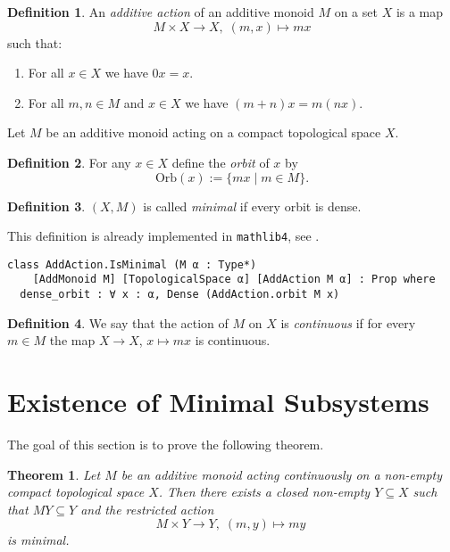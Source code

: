 \documentclass[11pt]{article}
\newtheorem{theorem}{Theorem}
\theoremstyle{definition}              %
\newtheorem{definition}{Definition}[section]
\theoremstyle{definition}              %
\theoremstyle{definition}              %
\begin{document}
\begin{definition}
An \emph{additive action} of an additive monoid $M$ on a set $X$ is a map 
\[
M \times X \to X, \; (m,x) \mapsto mx
\]
such that:
\begin{enumerate}
  \item For all $x \in X$ we have $0x = x$.
  \item For all $m,n \in M$ and $x \in X$ we have $(m + n)x = m(n x)$.
\end{enumerate}
\end{definition}

Let $M$ be an additive monoid acting on a compact topological space $X$.

\begin{definition}
For any $x \in X$ define the \emph{orbit} of $x$ by
\[
\mathrm{Orb}(x) := \{mx \mid m \in M\}.
\]
\end{definition}

\begin{definition}
$(X, M)$ is called \emph{minimal} if every orbit is dense.
\end{definition}

This definition is already implemented in \texttt{mathlib4}, see \cite{kudry}.

\begin{lstlisting}
class AddAction.IsMinimal (M α : Type*) 
    [AddMonoid M] [TopologicalSpace α] [AddAction M α] : Prop where
  dense_orbit : ∀ x : α, Dense (AddAction.orbit M x)
\end{lstlisting}

\begin{definition}
We say that the action of $M$ on $X$ is \emph{continuous} if for every $m \in M$ the map $X \to X$, $x \mapsto mx$ is continuous.
\end{definition}
\pagebreak

\section{Existence of Minimal Subsystems}

The goal of this section is to prove the following theorem.

\begin{theorem}\label{thm:existence-minimal-subsystem}\label{thm2}
Let $M$ be an additive monoid acting continuously on a non-empty compact topological space $X$. Then there exists a closed non-empty $Y \subseteq X$ such that $M Y \subseteq Y$ and the restricted action 
\[
M \times Y \to Y, \; (m,y) \mapsto my\
\]
is minimal.
\end{theorem}
\end{document}
